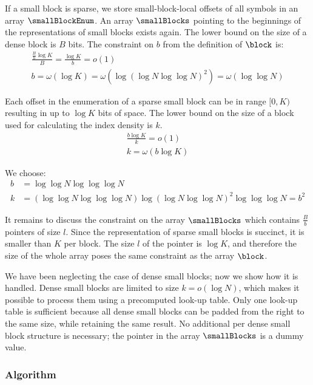 If a small block is sparse, we store small-block-local offsets of all symbols \ph{} in an array $\smallBlockEnum$.
An array $\smallBlocks$ pointing to the beginnings of the representations of small blocks exists again.
The lower bound on the size of a dense block is $B$ bits.
The constraint on $b$ from the definition of $\block$ is:
\begin{gather*}
\frac{\frac{B}{b} \log K}{B} = \frac{\log K}{b} = o(1) \\
b = \omega(\log K) = \omega(\log(\log N \log \log N)^2) = \omega(\log \log N)
\end{gather*}

Each offset in the enumeration of a sparse small block can be in range $[0, K)$ resulting in up to $\log K$ bits of space.
The lower bound on the size of a block used for calculating the index density is $k$.
\begin{gather*}
\frac{b \log K}{k} = o(1) \\
k = \omega(b\log K)
\end{gather*}

We choose:
\begin{align*}
b &= \log \log N \log \log \log N \\
k &= (\log \log N \log \log \log N) \log(\log N \log \log N)^2 \log \log \log N = b^2
\end{align*}

It remains to discuss the constraint on the array $\smallBlocks$ which contains $\frac{B}{b}$ pointers of size $l$.
Since the representation of sparse small blocks is succinct, it is smaller than $K$ per block.
The size $l$ of the pointer is $\log K$, and therefore the size of the whole array poses the same constraint as the array $\block$.

\bigbreak

We have been neglecting the case of dense small blocks; now we show how it is handled.
Dense small blocks are limited to size $k = o(\log N)$, which makes it possible to process them using a precomputed look-up table.
Only one look-up table is sufficient because all dense small blocks can be padded from the right to the same size, while retaining the same result.
No additional per dense small block structure is necessary; the pointer in the array $\smallBlocks$ is a dummy value.

\subsubsection{Algorithm}

